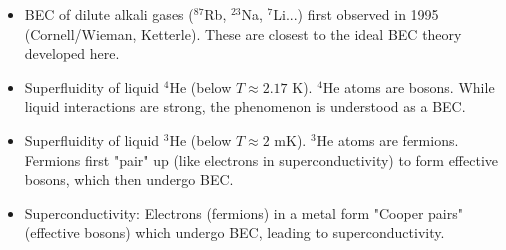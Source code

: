 \documentclass[11pt]{article}
\begin{document}
\begin{itemize}
    \item BEC of dilute alkali gases ($^{87}$Rb, $^{23}$Na, $^7$Li...) first observed in 1995 (Cornell/Wieman, Ketterle). These are closest to the ideal BEC theory developed here.
    \item Superfluidity of liquid $^4$He (below $T \approx 2.17$ K). $^4$He atoms are bosons. While liquid interactions are strong, the phenomenon is understood as a BEC.
    \item Superfluidity of liquid $^3$He (below $T \approx 2$ mK). $^3$He atoms are fermions. Fermions first "pair" up (like electrons in superconductivity) to form effective bosons, which then undergo BEC.
    \item Superconductivity: Electrons (fermions) in a metal form "Cooper pairs" (effective bosons) which undergo BEC, leading to superconductivity.
\end{itemize}
\end{document}
